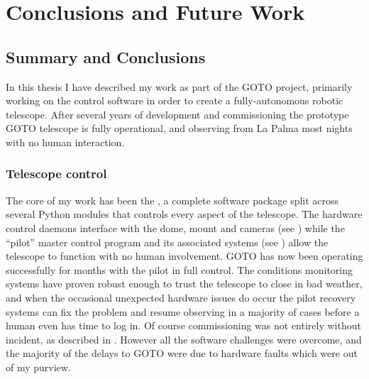 \chapter{Conclusions and Future Work}
\label{chap:conclusion}
\chaptoc{}


\newpage
\section{Summary and Conclusions}
\label{sec:conclusion}
\begin{colsection}


\begin{colsection}

In this thesis I have described my work as part of the GOTO project, primarily working on the control software in order to create a fully-autonomous robotic telescope. After several years of development and commissioning the prototype GOTO telescope is fully operational, and observing from La Palma most nights with no human interaction.

\end{colsection}


\subsection{Telescope control}
\label{sec:control_results}
\begin{colsection}

The core of my work has been the , a complete software package split across several Python modules that controls every aspect of the telescope. The hardware control daemons interface with the dome, mount and cameras (see ) while the ``pilot'' master control program and its associated systems (see ) allow the telescope to function with no human involvement. GOTO has now been operating successfully for months with the pilot in full control. The conditions monitoring systems have proven robust enough to trust the telescope to close in bad weather, and when the occasional unexpected hardware issues do occur the pilot recovery systems can fix the problem and resume observing in a majority of cases before a human even has time to log in. Of course commissioning was not entirely without incident, as described in . However all the software challenges were overcome, and the majority of the delays to GOTO were due to hardware faults which were out of my purview.


\end{colsection}
\end{colsection}
